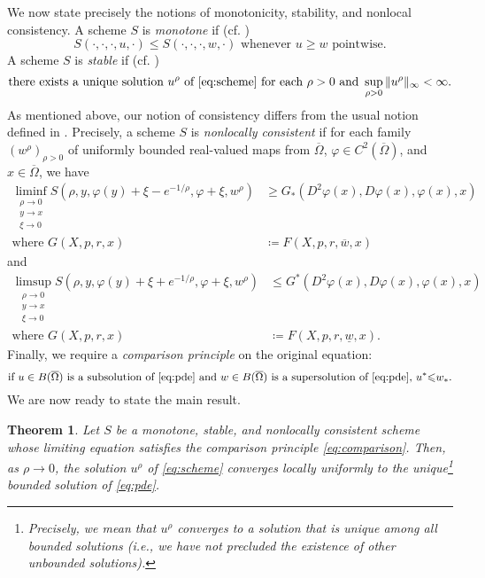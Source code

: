 \documentclass[12pt]{article}
\newcounter{dummy}
\newtheorem{theorem}[dummy]{Theorem}
\begin{document}
We now state precisely the notions of monotonicity, stability, and
nonlocal consistency. A scheme $S$ is \emph{monotone} if (cf. \cite[Eq. (2.2)]{MR1115933})
\[
S(\cdot,\cdot,\cdot,u,\cdot){\leqslant} S(\cdot,\cdot,\cdot,w,\cdot)\text{ whenever }u{\geqslant} w\text{ pointwise}.
\]
A scheme $S$ is \emph{stable} if (cf. \cite[Eq. (2.3)]{MR1115933})
\[
\text{there exists a unique solution }u^{\rho}\text{ of }\eqref{eq:scheme}\text{ for each }\rho>0\text{ and }\sup_{\rho>0}\Vert u^{\rho}\Vert_{\infty}<\infty.
\]
As mentioned above, our notion of consistency differs from the usual
notion defined in \cite[Eq. (2.4)]{MR1115933}. Precisely, a scheme
$S$ is \emph{nonlocally consistent} if for each family $(w^{\rho})_{\rho>0}$
of uniformly bounded real-valued maps from $\overline{\Omega}$, $\varphi\in C^{2}(\overline{\Omega})$,
and $x\in\overline{\Omega}$, we have
\begin{align}
\liminf_{\substack{\rho\rightarrow0\\
y\rightarrow x\\
\xi\rightarrow0
}
}S(\rho,y,\varphi(y)+\xi-e^{-1/\rho},\varphi+\xi,w^{\rho}) & {\geqslant} G_{*}(D^{2}\varphi(x),D\varphi(x),\varphi(x),x)\label{eq:subconsistency}\\
\text{where }G(X,p,r,x) & \coloneqq F(X,p,r,\overline{w},x)\nonumber 
\end{align}
and
\begin{align}
\limsup_{\substack{\rho\rightarrow0\\
y\rightarrow x\\
\xi\rightarrow0
}
}S(\rho,y,\varphi(y)+\xi+e^{-1/\rho},\varphi+\xi,w^{\rho}) & {\leqslant} G^{*}(D^{2}\varphi(x),D\varphi(x),\varphi(x),x)\label{eq:superconsistency}\\
\text{where }G(X,p,r,x) & \coloneqq F(X,p,r,\underline{w},x).\nonumber 
\end{align}
Finally, we require a \emph{comparison principle} on the original
equation:
\begin{equation}
\text{if }u\in B(\overline{\Omega})\text{ is a subsolution of }\eqref{eq:pde}\text{ and }w\in B(\overline{\Omega})\text{ is a supersolution of }\eqref{eq:pde}\text{, }u^{*}{\leqslant} w_{*}.\label{eq:comparison}
\end{equation}
We are now ready to state the main result.
\begin{theorem}
\label{thm:convergence_result}Let $S$ be a monotone, stable, and
nonlocally consistent scheme whose limiting equation satisfies the comparison
principle \eqref{eq:comparison}. Then, as $\rho\rightarrow0$,
the solution $u^{\rho}$ of \eqref{eq:scheme} converges locally uniformly
to the unique\footnote{Precisely, we mean that $u^{\rho}$ converges to a solution that is
unique among all bounded solutions (i.e., we have not precluded the
existence of other unbounded solutions).} bounded solution of \eqref{eq:pde}.
\end{theorem}
\end{document}
